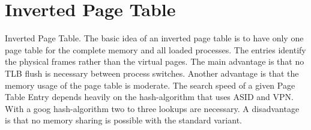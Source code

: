 \hypertarget{group___v_m_m___i_p_t}{
\section{Inverted Page Table}
\label{group___v_m_m___i_p_t}
}
Inverted Page Table. The basic idea of an inverted page table is to have only one page table for the complete memory and all loaded processes. The entries identify the physical frames rather than the virtual pages. The main advantage is that no TLB flush is necessary between process switches. Another advantage is that the memory usage of the page table is moderate. The search speed of a given Page Table Entry depends heavily on the hash-algorithm that uses ASID and VPN. With a goog hash-algorithm two to three lookups are necessary. A disadvantage is that no memory sharing is possible with the standard variant.  



